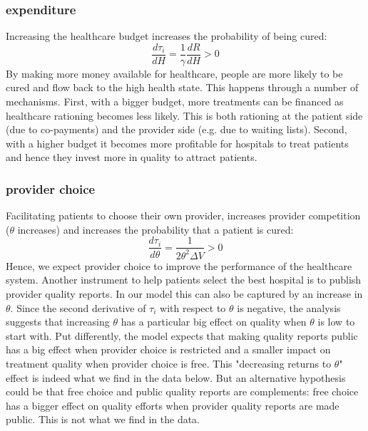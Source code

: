 \documentclass{article}
\begin{document}
\subsubsection{expenditure}
\label{sec:org44129f5}

Increasing the healthcare budget increases the probability of being cured:
\begin{equation}
\label{eq:16}
\frac{d\tau_i}{dH} = \frac{1}{\gamma} \frac{dR}{dH} > 0
\end{equation}
By making more money available for healthcare, people are more likely to be cured and flow back to the high health state. This happens through a number of mechanisms. First, with a bigger budget, more treatments can be financed as healthcare rationing becomes less likely. This is both rationing at the patient side (due to co-payments) and the provider side (e.g. due to waiting lists). Second, with a higher budget it becomes more profitable for hospitals to treat patients and hence they invest more in quality to attract patients.

\subsubsection{provider choice}
\label{sec:org44a3265}

Facilitating patients to choose their own provider, increases provider competition (\(\theta\) increases) and increases the probability that a patient is cured:
\begin{equation}
\label{eq:14}
\frac{d\tau_i}{d\theta} = \frac{1}{2 \theta^2 \Delta V} > 0
\end{equation}
Hence, we expect provider choice to improve the performance of the healthcare system. Another instrument to help patients select the best hospital is to publish provider quality reports. In our model this can also be captured by an increase in \(\theta\). Since the second derivative of \(\tau_i\) with respect to \(\theta\) is negative, the analysis suggests that increasing \(\theta\) has a particular big effect on quality when \(\theta\) is low to start with. Put differently, the model expects that making quality reports public has a big effect when provider choice is restricted and a smaller impact on treatment quality when provider choice is free. This "decreasing returns to \(\theta\)" effect is indeed what we find in the data below. But an alternative hypothesis could be that free choice and public quality reports are complements: free choice has a bigger effect on quality efforts when provider quality reports are made public. This is not what we find in the data.
\end{document}
